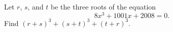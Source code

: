 Let $ r$, $ s$, and $ t$ be the three roots of the equation
\[ 8x^3+1001x+2008=0.\]Find $ (r+s)^3+(s+t)^3+(t+r)^3$.